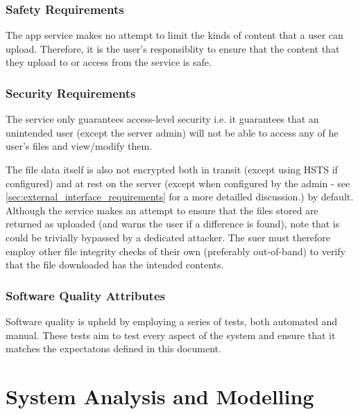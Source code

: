 \documentclass[12pt,a4paper]{report}
\begin{document}
\subsection{Safety Requirements}
The app service makes no attempt to limit the kinds of content that a user can upload.
Therefore, it is the user's responsiblity to ensure that the content that they upload to or access from the service is safe.
\subsection{Security Requirements}
The service only guarantees access-level security i.e. it guarantees that an unintended user (except the server admin) will not be able to access any of he user's files and view/modify them.

The file data itself is also not encrypted both in transit (except using HSTS if configured) and at rest on the server (except when configured by the admin - see \ref{sec:external_interface_requirements} for a more detailled discussion.) by default.
Although the service makes an attempt to ensure that the files stored are returned as uploaded (and warns the user if a difference is found), note that is could be trivially bypassed by a dedicated attacker.
The suer must therefore employ other file integrity checks of their own (preferably out-of-band) to verify that the file downloaded has the intended contents.
\subsection{Software Quality Attributes}
Software quality is upheld by employing a series of tests, both automated and manual.
These tests aim to test every aspect of the system and ensure that it matches the expectatons defined in this document.
\newpage
\chapter{System Analysis and Modelling}\label{cha:system_analysis_and_modelling}
\end{document}
